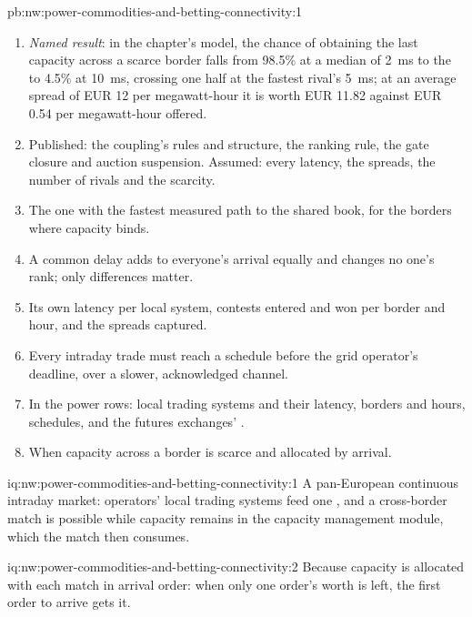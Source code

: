 \begin{solution}{pb:nw:power-commodities-and-betting-connectivity:1}
\begin{enumerate}[resume]
\item \emph{Named result}: in the chapter's model, the chance of obtaining the last capacity across a scarce border falls from 98.5\% at
  a median of \qty{2}{\milli\second} to the  to 4.5\% at \qty{10}{\milli\second}, crossing one half at the fastest
  rival's \qty{5}{\milli\second}; at an average spread of EUR 12 per megawatt-hour it is worth EUR 11.82 against EUR 0.54 per
  megawatt-hour offered.
\item Published: the coupling's rules and structure, the ranking rule, the gate closure and auction suspension. Assumed: every latency,
  the spreads, the number of rivals and the scarcity.
\item The one with the fastest measured path to the shared book, for the borders where capacity binds.
\item A common delay adds to everyone's arrival equally and changes no one's rank; only differences matter.
\item Its own latency per local system, contests entered and won per border and hour, and the spreads captured.
\item Every intraday trade must reach a schedule before the grid operator's deadline, over a slower, acknowledged channel.
\item In the power rows: local trading systems and their latency, borders and hours, schedules, and the futures exchanges' .
\item When capacity across a border is scarce and allocated by arrival.
\end{enumerate}
\end{solution}

\begin{solution}{iq:nw:power-commodities-and-betting-connectivity:1}
A pan-European continuous intraday market: operators' local trading systems feed one , and a cross-border match is
possible while capacity remains in the capacity management module, which the match then consumes.
\end{solution}

\begin{solution}{iq:nw:power-commodities-and-betting-connectivity:2}
Because capacity is allocated with each match in arrival order: when only one order's worth is left, the first order to arrive gets it.
\end{solution}

